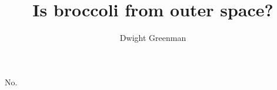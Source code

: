 \documentclass{bonaparticle}
\title {Is broccoli from outer space?}
\author{Dwight Greenman}
\begin{document}

    \begin{multicols}{3}

        \lipsum[2-8]
        
        \lipsum[9-37]
        
        No.
    \end{multicols}
\end{document}
